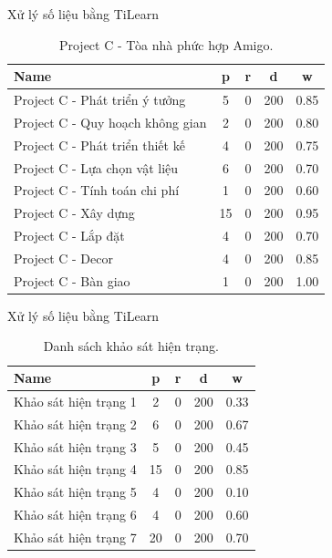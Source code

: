 \documentclass[10pt]{beamer}
\begin{document}
\begin{frame}{Xử lý số liệu bằng TiLearn}
    \begin{table}[ht]
        \centering
        \begin{tabular}{|l|c|c|c|c|}
        \hline
        \textbf{Name} & \textbf{p} & \textbf{r} & \textbf{d} & \textbf{w} \\
        \hline
        Project C - Phát triển ý tưởng    & 5  & 0  & 200 & 0.85 \\
        Project C - Quy hoạch không gian  & 2  & 0  & 200 & 0.80 \\
        Project C - Phát triển thiết kế   & 4  & 0  & 200 & 0.75 \\
        Project C - Lựa chọn vật liệu     & 6  & 0  & 200 & 0.70 \\
        Project C - Tính toán chi phí     & 1  & 0  & 200 & 0.60 \\
        Project C - Xây dựng              & 15 & 0  & 200 & 0.95 \\
        Project C - Lắp đặt               & 4  & 0  & 200 & 0.70 \\
        Project C - Decor                 & 4  & 0  & 200 & 0.85 \\
        Project C - Bàn giao              & 1  & 0  & 200 & 1.00 \\
        \hline
        \end{tabular}
        \caption{Project C - Tòa nhà phức hợp Amigo.}
        \end{table}
\end{frame}

\begin{frame}{Xử lý số liệu bằng TiLearn}
    \begin{table}[ht]
        \centering
        \begin{tabular}{|l|c|c|c|c|}
        \hline
        \textbf{Name} & \textbf{p} & \textbf{r} & \textbf{d} & \textbf{w} \\
        \hline
        Khảo sát hiện trạng 1 & 2  & 0  & 200 & 0.33 \\
        Khảo sát hiện trạng 2 & 6  & 0  & 200 & 0.67 \\
        Khảo sát hiện trạng 3 & 5  & 0  & 200 & 0.45 \\
        Khảo sát hiện trạng 4 & 15 & 0  & 200 & 0.85 \\
        Khảo sát hiện trạng 5 & 4  & 0  & 200 & 0.10 \\
        Khảo sát hiện trạng 6 & 4  & 0  & 200 & 0.60 \\
        Khảo sát hiện trạng 7 & 20 & 0  & 200 & 0.70 \\
        \hline
        \end{tabular}
        \caption{Danh sách khảo sát hiện trạng.}
        \end{table}

\end{frame}
\end{document}
